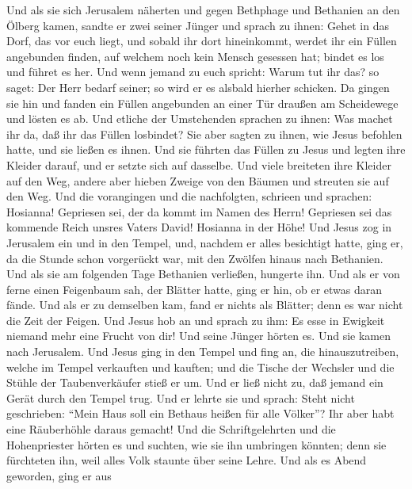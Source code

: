 Und als sie sich Jerusalem näherten und gegen Bethphage
und Bethanien an den Ölberg kamen, sandte er zwei seiner Jünger
 und sprach zu ihnen: Gehet in das Dorf, das vor euch
liegt, und sobald ihr dort hineinkommt, werdet ihr ein Füllen angebunden
finden, auf welchem noch kein Mensch gesessen hat; bindet es los und
führet es her.  Und wenn jemand zu euch spricht: Warum tut
ihr das? so saget: Der Herr bedarf seiner; so wird er es alsbald hierher
schicken.  Da gingen sie hin und fanden ein Füllen
angebunden an einer Tür draußen am Scheidewege und lösten es ab.
 Und etliche der Umstehenden sprachen zu ihnen: Was machet
ihr da, daß ihr das Füllen losbindet?  Sie aber sagten zu
ihnen, wie Jesus befohlen hatte, und sie ließen es ihnen. 
Und sie führten das Füllen zu Jesus und legten ihre Kleider darauf, und
er setzte sich auf dasselbe.  Und viele breiteten ihre
Kleider auf den Weg, andere aber hieben Zweige von den Bäumen und
streuten sie auf den Weg.  Und die vorangingen und die
nachfolgten, schrieen und sprachen: Hosianna! Gepriesen sei, der da
kommt im Namen des Herrn!  Gepriesen sei das kommende
Reich unsres Vaters David! Hosianna in der Höhe!  Und
Jesus zog in Jerusalem ein und in den Tempel, und, nachdem er alles
besichtigt hatte, ging er, da die Stunde schon vorgerückt war, mit den
Zwölfen hinaus nach Bethanien.  Und als sie am folgenden
Tage Bethanien verließen, hungerte ihn.  Und als er von
ferne einen Feigenbaum sah, der Blätter hatte, ging er hin, ob er etwas
daran fände. Und als er zu demselben kam, fand er nichts als Blätter;
denn es war nicht die Zeit der Feigen.  Und Jesus hob an
und sprach zu ihm: Es esse in Ewigkeit niemand mehr eine Frucht von dir!
Und seine Jünger hörten es.  Und sie kamen nach
Jerusalem. Und Jesus ging in den Tempel und fing an, die
hinauszutreiben, welche im Tempel verkauften und kauften; und die Tische
der Wechsler und die Stühle der Taubenverkäufer stieß er um.
 Und er ließ nicht zu, daß jemand ein Gerät durch den
Tempel trug.  Und er lehrte sie und sprach: Steht nicht
geschrieben: ``Mein Haus soll ein Bethaus heißen für alle Völker''? Ihr
aber habt eine Räuberhöhle daraus gemacht!  Und die
Schriftgelehrten und die Hohenpriester hörten es und suchten, wie sie
ihn umbringen könnten; denn sie fürchteten ihn, weil alles Volk staunte
über seine Lehre.  Und als es Abend geworden, ging er aus

